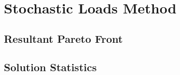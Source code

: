 \section{Stochastic Loads Method}
\subsection{Resultant Pareto Front}
\subsection{Solution Statistics}
